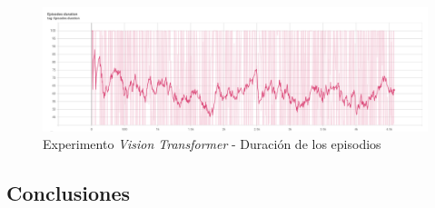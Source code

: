 \begin{figure}[H]
	\centering
	\includegraphics[width=1\textwidth]{figuras/experiments/vision transformers/episodes_duration.png}
	\caption[Experimento \textit{Vision Transformer} - Duración de los episodios]{Experimento \textit{Vision Transformer} - Duración de los episodios}
	\label{fig-experimento-vision-transformer-1-episodes-duration}
\end{figure}


\subsection{Conclusiones}
\label{resultados-conclusiones-actor-critic-experimentos}
